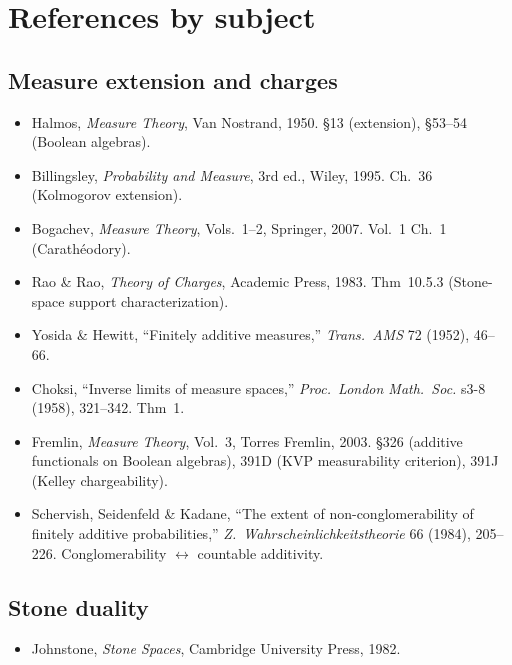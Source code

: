 \section{References by subject}
\label{sec:refs}

\subsection*{Measure extension and charges}
\begin{itemize}
  \item Halmos, \emph{Measure Theory}, Van Nostrand, 1950.  \S13 (extension), \S53--54 (Boolean algebras).~\cite{Halmos1950}
  \item Billingsley, \emph{Probability and Measure}, 3rd ed., Wiley, 1995.  Ch.~36 (Kolmogorov extension).~\cite{Billingsley1995}
  \item Bogachev, \emph{Measure Theory}, Vols.~1--2, Springer, 2007.  Vol.~1 Ch.~1 (Carath\'{e}odory).~\cite{Bogachev2007}
  \item Rao \& Rao, \emph{Theory of Charges}, Academic Press, 1983.  Thm~10.5.3 (Stone-space support characterization).~\cite{RaoRao1983}
  \item Yosida \& Hewitt, ``Finitely additive measures,'' \emph{Trans.\ AMS} 72 (1952), 46--66.~\cite{YosidaHewitt1952}
  \item Choksi, ``Inverse limits of measure spaces,'' \emph{Proc.\ London Math.\ Soc.} s3-8 (1958), 321--342.  Thm~1.~\cite{Choksi1958}
  \item Fremlin, \emph{Measure Theory}, Vol.~3, Torres Fremlin, 2003.  \S326 (additive functionals on Boolean algebras), 391D (KVP measurability criterion), 391J (Kelley chargeability).~\cite{Fremlin2003}
  \item Schervish, Seidenfeld \& Kadane, ``The extent of non-conglomerability of finitely additive probabilities,'' \emph{Z.\ Wahrscheinlichkeitstheorie} 66 (1984), 205--226.  Conglomerability $\leftrightarrow$ countable additivity.~\cite{Seidenfeld1984}
\end{itemize}

\subsection*{Stone duality}
\begin{itemize}
  \item Johnstone, \emph{Stone Spaces}, Cambridge University Press, 1982.~\cite{Johnstone1982}
\end{itemize}


